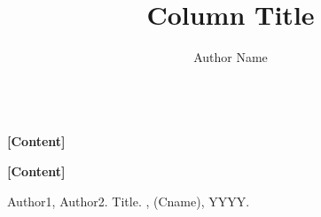 \documentclass{sig-alternate-10pt}
\title{Column Title}
\author{
\alignauthor
Author Name\\
       \affaddr{Affiliation}\\
       \email{name@email.edu}
}
\begin{document}
\maketitle{}

\noindent\textbf{[Content]} 
\lipsum[2-4]

\noindent\textbf{[Content]} 
\lipsum[2-4]\cite{item}



\balance

\begin{thebibliography}{10}

Author1, Author2.
\newblock Title.
, (Cname), YYYY.


\end{thebibliography}
\end{document}
